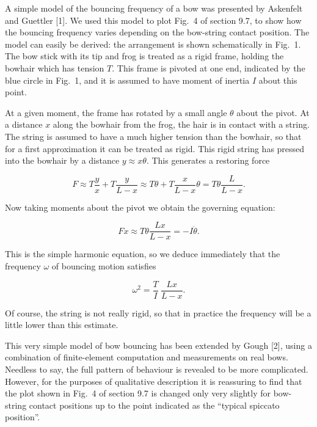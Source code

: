   A simple model of the bouncing frequency of a bow was presented by Askenfelt 
  and Guettler [1]. We used this model to plot Fig.\ 4 of section 9.7, to show 
  how the bouncing frequency varies depending on the bow-string contact 
  position. The model can easily be derived: the arrangement is shown 
  schematically in Fig.\ 1. The bow stick with its tip and frog is treated as a 
  rigid frame, holding the bowhair which has tension $T$. This frame is pivoted 
  at one end, indicated by the blue circle in Fig.\ 1, and it is assumed to 
  have moment of inertia $I$ about this point. 


  At a given moment, the frame has rotated by a small angle $\theta$ about the 
  pivot. At a distance $x$ along the bowhair from the frog, the hair is in 
  contact with a string. The string is assumed to have a much higher tension 
  than the bowhair, so that for a first approximation it can be treated as 
  rigid. This rigid string has pressed into the bowhair by a distance $y 
  \approx x \theta$. This generates a restoring force 

  \begin{equation*}F \approx T \frac{y}{x} +T \frac{y}{L-x} \approx T \theta + 
  T \frac{x}{L-x} \theta = T \theta \frac{L}{L-x} . \tag{1}\end{equation*} 

  Now taking moments about the pivot we obtain the governing equation: 

  \begin{equation*}Fx \approx T \theta \frac{Lx}{L-x} =-I \ddot{\theta} . 
  \tag{2}\end{equation*} 

  This is the simple harmonic equation, so we deduce immediately that the 
  frequency $\omega$ of bouncing motion satisfies 

  \begin{equation*}\omega^2=\frac{T}{I}~\frac{Lx}{L-x} . \tag{3}\end{equation*} 

  Of course, the string is not really rigid, so that in practice the frequency 
  will be a little lower than this estimate. 

  This very simple model of bow bouncing has been extended by Gough [2], using 
  a combination of finite-element computation and measurements on real bows. 
  Needless to say, the full pattern of behaviour is revealed to be more 
  complicated. However, for the purposes of qualitative description it is 
  reassuring to find that the plot shown in Fig.\ 4 of section 9.7 is changed 
  only very slightly for bow-string contact positions up to the point indicated 
  as the ``typical spiccato position''. 


